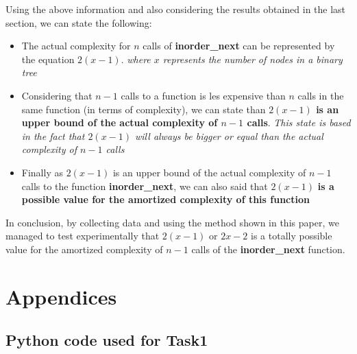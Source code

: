 \documentclass[12p]{report}
\begin{document}
Using the above information and also considering the results obtained in the last section, we can state the following:
\begin{itemize}
  \item The actual complexity for $n$ calls of \textbf{inorder\_next } can be represented by the equation $2(x-1)$. \textit{where $x$ represents the number of nodes in a binary tree}
  \item Considering that $n-1$ calls to a function is les expensive than $n$ calls in the same function (in terms of complexity), we can state than \textbf{$2(x-1)$ is an upper bound of the actual complexity of $n-1$ calls}. \textit{This state is based in the fact that $2(x-1)$ will always be bigger or equal than the actual complexity of $n-1$ calls}
  \item Finally as $2(x-1)$ is an upper bound of the actual complexity of $n-1$ calls to the function \textbf{inorder\_next}, we can also said that $2(x-1)$ \textbf{is a possible value for the amortized complexity of this function}
\end{itemize}

\bigskip

In conclusion, by collecting data and using the method shown in this paper, we managed to test experimentally that $2(x-1)$ or $2x-2$ is a totally possible value for the amortized complexity of $n-1$ calls of the \textbf{inorder\_next} function.



   \newpage 				%

  \section{Appendices}

  \subsection{Python code used for Task1}

 
 
\end{document}
